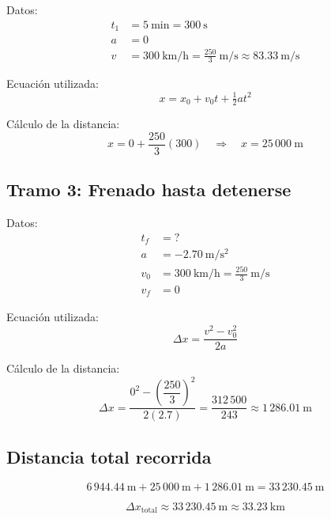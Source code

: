 \documentclass{article}
\begin{document}
Datos:
\begin{align*}
t_1 &= 5\ \text{min} = 300\ \text{s} \\
a &= 0 \\
v &= \SI{300}{\kilo\meter\per\hour} = \frac{250}{3}\ \text{m/s} \approx 83.33\ \text{m/s}
\end{align*}

Ecuación utilizada:
\[
x = x_0 + v_0 t + \tfrac{1}{2}at^2
\]

Cálculo de la distancia:
\[
x = 0 + \frac{250}{3}(300) \quad \Longrightarrow \quad x = 25\,000\ \text{m}
\]

\subsection*{Tramo 3: Frenado hasta detenerse}

Datos:
\begin{align*}
t_f &= {}? \\
a &= -\SI{2.70}{\meter\per\second\squared} \\
v_0 &= \SI{300}{\kilo\meter\per\hour} = \frac{250}{3}\ \text{m/s} \\
v_f &= 0
\end{align*}

Ecuación utilizada:
\[
\Delta x = \frac{v^2 - v_0^2}{2a}
\]

Cálculo de la distancia:
\[
\Delta x = \frac{0^2 - {\left(\dfrac{250}{3}\right)}^2}{2(2.7)} = \frac{312\,500}{243} \approx 1\,286.01\ \text{m}
\]

\subsection*{Distancia total recorrida}

\[
6\,944.44\ \text{m} + 25\,000\ \text{m} + 1\,286.01\ \text{m} = 33\,230.45\ \text{m}
\]

\[
\boxed{\Delta x_{\text{total}} \approx 33\,230.45\ \text{m} \approx 33.23\ \text{km}}
\]
\end{document}
